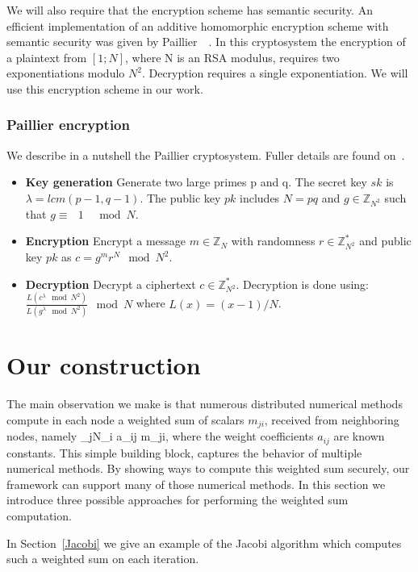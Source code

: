 \documentclass[times, 10pt,twocolumn]{article}
\begin{document}
We will also  require that the encryption scheme has semantic security.
An efficient implementation of an
additive homomorphic encryption scheme with semantic security was
given by Paillier~~\cite{Paillier}. In this cryptosystem the
encryption of a plaintext from $[1;N]$, where N is an RSA modulus,
requires two exponentiations modulo $N^2$. Decryption requires a
single exponentiation. We will use this encryption scheme in our work.

\subsubsection{Paillier encryption}
We describe in a nutshell the Paillier cryptosystem. Fuller
details are found on~\cite{Paillier}.
\begin{itemize}
    \item {\bf Key generation} Generate two large primes p
and q. The secret key $sk$ is $\lambda = lcm(p - 1, q - 1)$. The
public key $pk$ includes $N = pq$ and $g  \in \mathbb{Z}_{N^2}$
such that $g \equiv \mbox{  }1 \mbox{  } \mod N$.
    \item {\bf Encryption} Encrypt a message $m \in \mathbb{Z}_{N}$ with randomness
$r \in \mathbb{Z}_{N^2}^*$ and public key $pk$ as $c = g^mr^N \mod
N^2$.
    \item {\bf Decryption} Decrypt a ciphertext $c \in \mathbb{Z}_{N^2}^*$.
    Decryption is done using: $\frac{L(c^\lambda \mod N^2)}{L(g^\lambda \mod
    N^2)} \mod N$ where $L(x) = (x - 1)/N$.
\end{itemize}



\section{Our construction}
\label{const} The main observation we make is that numerous
distributed numerical methods compute in each node a weighted sum
of scalars $m_{ji}$, received from neighboring nodes, namely \BE
\label{ws} \sum_{j\in N_i} a_{ij} m_{ji}, \EE where the weight
coefficients $a_{ij}$  are known constants. This simple
building block, captures the behavior of multiple numerical
methods. By showing ways to compute this weighted sum securely,
our framework can support many of those numerical methods. In this
section we introduce three possible approaches for performing the
weighted sum computation.

In Section~\ref{Jacobi} we give an example of the Jacobi algorithm
which computes such a weighted sum on each iteration.
\end{document}
